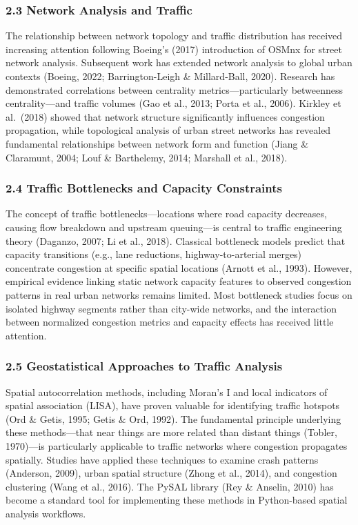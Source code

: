 \documentclass[
  12pt,
]{article}
\begin{document}
\subsubsection{2.3 Network Analysis and Traffic}\label{network-analysis-and-traffic}

The relationship between network topology and traffic distribution has received increasing attention following Boeing's (2017) introduction of OSMnx for street network analysis. Subsequent work has extended network analysis to global urban contexts (Boeing, 2022; Barrington-Leigh \& Millard-Ball, 2020). Research has demonstrated correlations between centrality metrics---particularly betweenness centrality---and traffic volumes (Gao et al., 2013; Porta et al., 2006). Kirkley et al.~(2018) showed that network structure significantly influences congestion propagation, while topological analysis of urban street networks has revealed fundamental relationships between network form and function (Jiang \& Claramunt, 2004; Louf \& Barthelemy, 2014; Marshall et al., 2018).

\subsubsection{2.4 Traffic Bottlenecks and Capacity Constraints}\label{traffic-bottlenecks-and-capacity-constraints}

The concept of traffic bottlenecks---locations where road capacity decreases, causing flow breakdown and upstream queuing---is central to traffic engineering theory (Daganzo, 2007; Li et al., 2018). Classical bottleneck models predict that capacity transitions (e.g., lane reductions, highway-to-arterial merges) concentrate congestion at specific spatial locations (Arnott et al., 1993). However, empirical evidence linking static network capacity features to observed congestion patterns in real urban networks remains limited. Most bottleneck studies focus on isolated highway segments rather than city-wide networks, and the interaction between normalized congestion metrics and capacity effects has received little attention.

\subsubsection{2.5 Geostatistical Approaches to Traffic Analysis}\label{geostatistical-approaches-to-traffic-analysis}

Spatial autocorrelation methods, including Moran's I and local indicators of spatial association (LISA), have proven valuable for identifying traffic hotspots (Ord \& Getis, 1995; Getis \& Ord, 1992). The fundamental principle underlying these methods---that near things are more related than distant things (Tobler, 1970)---is particularly applicable to traffic networks where congestion propagates spatially. Studies have applied these techniques to examine crash patterns (Anderson, 2009), urban spatial structure (Zhong et al., 2014), and congestion clustering (Wang et al., 2016). The PySAL library (Rey \& Anselin, 2010) has become a standard tool for implementing these methods in Python-based spatial analysis workflows.
\end{document}
